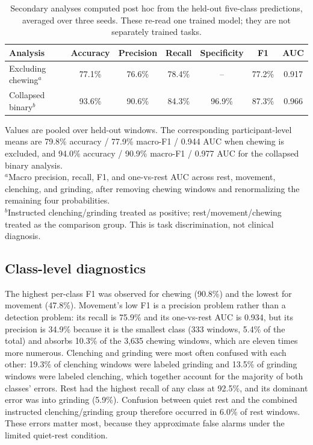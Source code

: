 \documentclass[pdflatex,sn-nature,iicol]{sn-jnl}
\begin{document}
\begin{table}[h]
  \caption{Secondary analyses computed post hoc from the held-out five-class predictions, averaged over three seeds. These re-read one trained model; they are not separately trained tasks.}
  \label{tab:sensitivity}
  \centering
  \begin{tabular}{lcccccc}
    \toprule
    Analysis & Accuracy & Precision & Recall & Specificity & F1 & AUC \\
    \midrule
    Excluding chewing$^{a}$ & 77.1\% & 76.6\% & 78.4\% & -- & 77.2\% & 0.917 \\
    Collapsed binary$^{b}$ & 93.6\% & 90.6\% & 84.3\% & 96.9\% & 87.3\% & 0.966 \\
    \bottomrule
  \end{tabular}
  \begin{flushleft}\footnotesize
  Values are pooled over held-out windows. The corresponding participant-level means are 79.8\% accuracy / 77.9\% macro-F1 / 0.944 AUC when chewing is excluded, and 94.0\% accuracy / 90.9\% macro-F1 / 0.977 AUC for the collapsed binary analysis.\\
  $^{a}$Macro precision, recall, F1, and one-vs-rest AUC across rest, movement, clenching, and grinding, after removing chewing windows and renormalizing the remaining four probabilities.\\
  $^{b}$Instructed clenching/grinding treated as positive; rest/movement/chewing treated as the comparison group. This is task discrimination, not clinical diagnosis.
  \end{flushleft}
\end{table}

\subsection{Class-level diagnostics}

The highest per-class F1 was observed for chewing (90.8\%) and the lowest for movement (47.8\%). Movement's low F1 is a precision problem rather than a detection problem: its recall is 75.9\% and its one-vs-rest AUC is 0.934, but its precision is 34.9\% because it is the smallest class (333 windows, 5.4\% of the total) and absorbs 10.3\% of the 3,635 chewing windows, which are eleven times more numerous. Clenching and grinding were most often confused with each other: 19.3\% of clenching windows were labeled grinding and 13.5\% of grinding windows were labeled clenching, which together account for the majority of both classes' errors. Rest had the highest recall of any class at 92.5\%, and its dominant error was into grinding (5.9\%). Confusion between quiet rest and the combined instructed clenching/grinding group therefore occurred in 6.0\% of rest windows. These errors matter most, because they approximate false alarms under the limited quiet-rest condition.
\end{document}
